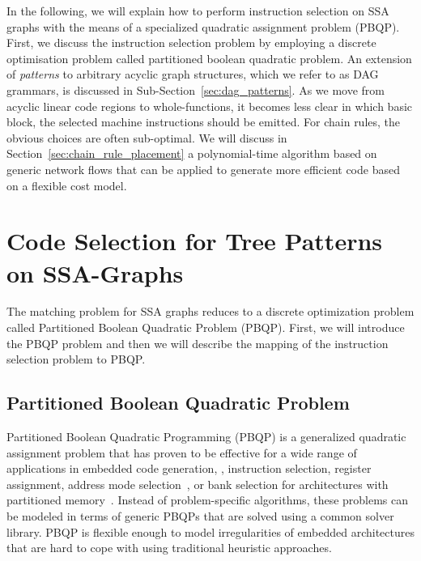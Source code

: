 In the following, we will explain how to perform instruction selection
on SSA graphs with the means of a specialized quadratic assignment
problem (PBQP). First, we discuss the instruction selection problem by
employing a discrete optimisation problem called partitioned boolean
quadratic problem.  An extension of \emph{patterns} to arbitrary
acyclic graph structures, which we refer to as DAG grammars, is
discussed in Sub-Section~\ref{sec:dag_patterns}. As we move from
acyclic linear code regions to whole-functions, it becomes less
clear in which basic block, the selected machine instructions should
be emitted. For chain rules, the obvious choices are often
sub-optimal. We will discuss in Section~\ref{sec:chain_rule_placement}
a polynomial-time algorithm based on generic network flows that can be
applied to generate more efficient code based on a flexible cost
model.

\section{Code Selection for Tree Patterns on SSA-Graphs}
The matching problem for SSA graphs reduces to a discrete 
optimization problem called Partitioned Boolean Quadratic Problem (PBQP). 
First, we will introduce
the PBQP problem and then we will describe the 
mapping of the instruction selection problem to PBQP.

\subsection{Partitioned Boolean Quadratic Problem}
\label{sec:pbqp}
Partitioned Boolean Quadratic Programming
(PBQP) is a generalized quadratic assignment problem that has proven
to be effective for a wide range of applications in embedded code
generation, \eg, instruction selection, register assignment, address
mode selection~\cite{Eck03}, or bank selection for architectures with
partitioned memory~\cite{journals/tecs/ScholzBX08}. Instead of
problem-specific algorithms, these problems can be modeled in terms of
generic {PBQP}s that are solved using a common solver library. PBQP
is flexible enough to model irregularities of embedded architectures
that are hard to cope with using traditional heuristic approaches.

